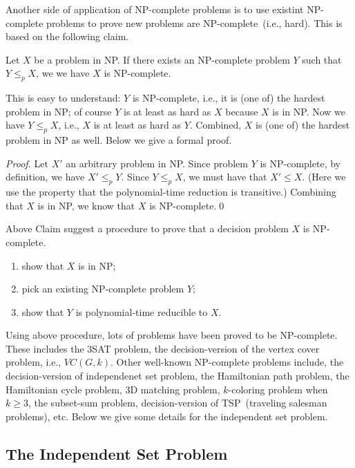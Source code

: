 Another side of application of NP-complete problems is to use existint NP-complete problems
to prove new problems are NP-complete~(i.e., hard). This is based on the following claim.

\begin{claim}
Let $X$ be a problem in NP. If there exists an NP-complete problem $Y$ such that $Y\le_p X$,
we we have $X$ is NP-complete.
\end{claim}

This is easy to understand: $Y$ is NP-complete, i.e., it is (one of) the hardest problem
in NP; of course $Y$ is at least as hard as $X$ because $X$ is in NP.
Now we have $Y\le_p X$, i.e., $X$ is at least as hard as $Y$. Combined, $X$ is (one of) the
hardest problem in NP as well. Below we give a formal proof.

\emph{Proof.} Let $X'$ an arbitrary problem in NP. Since problem $Y$ is NP-complete,
by definition, we have $X' \le_p Y$. Since $Y\le_p X$, we must have that $X'\le X$.
(Here we use the property that the polynomial-time reduction is transitive.)
Combining that $X$ is in NP, we know that $X$ is NP-complete.\qed

Above Claim suggest a procedure to prove that a decision problem $X$ is NP-complete.
\vspace*{-\topsep}
\begin{enumerate}
\item show that $X$ is in NP;
\item pick an existing NP-complete problem $Y$;
\item show that $Y$ is polynomial-time reducible to $X$. 
\end{enumerate}

Using above procedure, lots of problems have been proved to be NP-complete.
These includes the 3SAT problem, the decision-version of the vertex cover problem, i.e., $VC(G,k)$.
Other well-known NP-complete problems include, the decision-version of independenet set problem,
the Hamiltonian path problem, 
the Hamiltonian cycle problem, 
3D matching problem, $k$-coloring problem when $k\ge 3$, the subset-sum problem, decision-version of TSP~(traveling salesman problems), etc.
Below we give some details for the independent set problem.

\subsection*{The Independent Set Problem}

